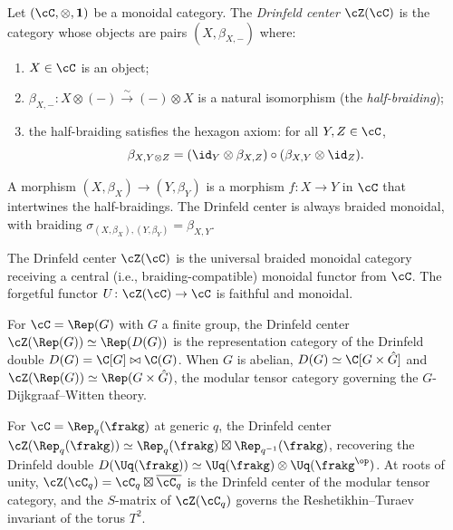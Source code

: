 \begin{definition}
\label{def:drinfeld-center}
Let $(\cC, \otimes, \mathbf{1})$ be a monoidal category. The
\emph{Drinfeld center} $\cZ(\cC)$ is the category whose objects are
pairs $(X, \beta_{X,-})$ where:
\begin{enumerate}[label=(\roman*)]
 \item $X \in \cC$ is an object;
 \item $\beta_{X,-} \colon X \otimes (-) \xrightarrow{\sim} (-) \otimes X$
 is a natural isomorphism (the \emph{half-braiding});
 \item the half-braiding satisfies the hexagon axiom: for all
 $Y, Z \in \cC$,
 \[
 \beta_{X, Y \otimes Z}
 = (\id_Y \otimes \beta_{X,Z}) \circ (\beta_{X,Y} \otimes \id_Z).
 \]
\end{enumerate}
A morphism $(X, \beta_X) \to (Y, \beta_Y)$ is a morphism $f \colon X \to Y$
in $\cC$ that intertwines the half-braidings. The Drinfeld center is
always braided monoidal, with braiding
$\sigma_{(X,\beta_X),(Y,\beta_Y)} = \beta_{X,Y}$.
\end{definition}

\begin{proposition}
\label{prop:drinfeld-center-universal}
The Drinfeld center $\cZ(\cC)$ is the universal braided monoidal
category receiving a central (i.e., braiding-compatible) monoidal
functor from $\cC$. The forgetful functor
$U \colon \cZ(\cC) \to \cC$ is faithful and monoidal.
\end{proposition}

\begin{example}
\label{ex:drinfeld-center-finite-group}
For $\cC = \Rep(G)$ with $G$ a finite group, the Drinfeld center
$\cZ(\Rep(G)) \simeq \Rep(D(G))$ is the representation category of
the Drinfeld double $D(G) = \C[G] \bowtie \C(G)$. When $G$ is
abelian, $D(G) \simeq \C[G \times \hat{G}]$ and
$\cZ(\Rep(G)) \simeq \Rep(G \times \hat{G})$, the modular
tensor category governing the $G$-Dijkgraaf--Witten theory.
\end{example}

\begin{example}
\label{ex:drinfeld-center-quantum-group}
For $\cC = \Rep_q(\frakg)$ at generic $q$, the Drinfeld center
$\cZ(\Rep_q(\frakg)) \simeq \Rep_q(\frakg) \boxtimes
\Rep_{q^{-1}}(\frakg)$, recovering the Drinfeld double
$D(\Uq(\frakg)) \simeq \Uq(\frakg) \otimes \Uq(\frakg^{\op})$.
At roots of unity, $\cZ(\cC_q) = \cC_q \boxtimes \overline{\cC_q}$
is the Drinfeld center of the modular tensor category, and the
$S$-matrix of $\cZ(\cC_q)$ governs the Reshetikhin--Turaev
invariant of the torus $T^2$.
\end{example}


